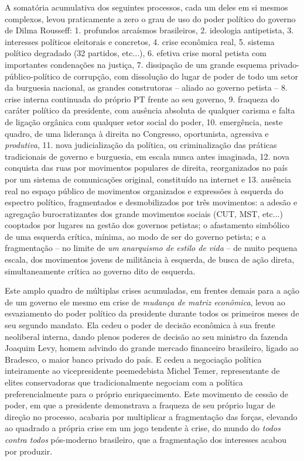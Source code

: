 A somatória acumulativa dos seguintes processos, cada um deles em si
mesmos complexos, levou praticamente a zero o grau de uso do poder
político do governo de Dilma Rousseff: 1. profundos arcaísmos
brasileiros, 2. ideologia antipetista, 3. interesses políticos
eleitorais e concretos, 4. crise econômica real, 5. sistema político
degradado (32 partidos, etc...), 6. efetiva crise moral petista com
importantes condenações na justiça, 7. dissipação de um grande esquema
privado-público-político de corrupção, com dissolução do lugar de poder
de todo um setor da burguesia nacional, as grandes construtoras --
aliado ao governo petista -- 8. crise interna continuada do próprio PT
frente ao seu governo, 9. fraqueza do caráter político da presidente,
com ausência absoluta de qualquer carisma e falta de ligação orgânica
com qualquer setor social do poder, 10. emergência, neste quadro, de uma
liderança à direita no Congresso, oportunista, agressiva e
\emph{produtiva}, 11. nova judicialização da política, ou criminalização
das práticas tradicionais de governo e burguesia, em escala nunca antes
imaginada, 12. nova conquista das ruas por movimentos populares de
direita, reorganizados no país por um sistema de comunicações original,
constituído na internet e 13. ausência real no espaço público de
movimentos organizados e expressões à esquerda do espectro político,
fragmentados e desmobilizados por três movimentos: a adesão e agregação
burocratizantes dos grande movimentos sociais (CUT, MST, etc...)
cooptados por lugares na gestão dos governos petistas; o afastamento
simbólico de uma esquerda crítica, mínima, ao modo de ser do governo
petista; e a fragmentação -- no limite de \emph{um anarquismo de estilo
de vida} -- de muito pequena escala, dos movimentos jovens de militância
à esquerda, de busca de ação direta, simultaneamente crítica ao governo
dito de esquerda.

Este amplo quadro de múltiplas crises acumuladas, em frentes demais para
a ação de um governo ele mesmo em crise de \emph{mudança de matriz
econômica}, levou ao esvaziamento do poder político da presidente
durante todos os primeiros meses de seu segundo mandato. Ela cedeu o
poder de decisão econômica à sua frente neoliberal interna, dando plenos
poderes de decisão ao seu ministro da fazenda Joaquim Levy, homem
advindo do grande mercado financeiro brasileiro, ligado ao Bradesco, o
maior banco privado do país. E cedeu a negociação política inteiramente
ao vicepresidente peemedebista Michel Temer, representante de elites
conservadoras que tradicionalmente negociam com a política
preferencialmente para o próprio enriquecimento. Este movimento de
cessão de poder, em que a presidente demonstrava a fraqueza de seu
próprio lugar de direção no processo, acabaria por multiplicar a
fragmentação das forças, elevando ao quadrado a própria crise em um jogo
tendente à crise, do mundo do \emph{todos contra todos} pós-moderno
brasileiro, que a fragmentação dos interesses acabou por produzir.

